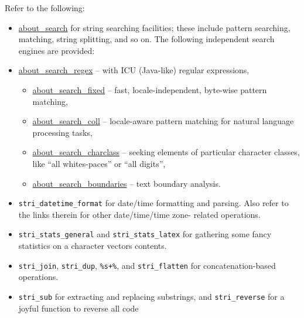 \documentclass[
]{article}
\begin{document}
Refer to the following:

\begin{itemize}
\item
  \href{vscode-webview://00i87qrgljff0t3jmc9gjufilst9usetvkh9gn773om0ic67o1j2/stringi/help/about_search}{about\_search}
  for string searching facilities; these include pattern searching,
  matching, string splitting, and so on. The following independent
  search engines are provided:
\item
  \href{vscode-webview://00i87qrgljff0t3jmc9gjufilst9usetvkh9gn773om0ic67o1j2/stringi/help/about_search_regex}{about\_search\_regex}
  -- with ICU (Java-like) regular expressions,

  \begin{itemize}
  \item
    \href{vscode-webview://00i87qrgljff0t3jmc9gjufilst9usetvkh9gn773om0ic67o1j2/stringi/help/about_search_fixed}{about\_search\_fixed}
    -- fast, locale-independent, byte-wise pattern matching,
  \item
    \href{vscode-webview://00i87qrgljff0t3jmc9gjufilst9usetvkh9gn773om0ic67o1j2/stringi/help/about_search_coll}{about\_search\_coll}
    -- locale-aware pattern matching for natural language processing
    tasks,
  \item
    \href{vscode-webview://00i87qrgljff0t3jmc9gjufilst9usetvkh9gn773om0ic67o1j2/stringi/help/about_search_charclass}{about\_search\_charclass}
    -- seeking elements of particular character classes, like ``all
    whites-paces'' or ``all digits'',
  \item
    \href{vscode-webview://00i87qrgljff0t3jmc9gjufilst9usetvkh9gn773om0ic67o1j2/stringi/help/about_search_boundaries}{about\_search\_boundaries}
    -- text boundary analysis.
  \end{itemize}
\item
  \texttt{stri\_datetime\_format} for date/time formatting and parsing.
  Also refer to the links therein for other date/time/time zone- related
  operations.
\item
  \texttt{stri\_stats\_general} and \texttt{stri\_stats\_latex} for
  gathering some fancy statistics on a character
  vector\textquotesingle s contents.
\item
  \texttt{stri\_join}, \texttt{stri\_dup}, \texttt{\%s+\%}, and
  \texttt{stri\_flatten} for concatenation-based operations.
\item
  \texttt{stri\_sub} for extracting and replacing substrings, and
  \texttt{stri\_reverse} for a joyful function to reverse all code

\end{itemize}
\end{document}
